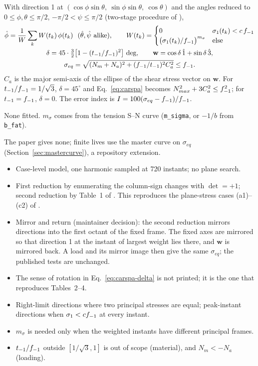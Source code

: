  With direction 1 at $(\cos\phi\sin\theta,\ \sin\phi\sin\theta,\ \cos\theta)$
and the angles reduced to $0\le\phi,\theta\le\pi/2$, $-\pi/2<\psi\le\pi/2$ (two-stage procedure
of \cite{carpinteri1999}),
\begin{gather}
\hat\phi=\frac1W\sum_k W(t_k)\,\phi(t_k)\ \ (\hat\theta,\hat\psi\ \text{alike}),\qquad
W(t_k)=\begin{cases}0 & \sigma_1(t_k)<c\,\fm\\ \bigl(\sigma_1(t_k)/\fm\bigr)^{m_\sigma} & \text{else}\end{cases}
\label{eq:carspa-avg}\\
\delta = 45\cdot\tfrac32\bigl[1-(\tm/\fm)^2\bigr]\ \text{deg},\qquad
\mathbf w=\cos\delta\,\hat 1+\sin\delta\,\hat 3 , \label{eq:carspa-delta}\\
\sigma_{eq}=\sqrt{(N_m+N_a)^2+(\fm/\tm)^2C_a^2}\le\fm . \label{eq:carspa}
\end{gather}
$C_a$ is the major semi-axis of the ellipse of the shear stress vector on $\mathbf w$. For
$t_{-1}/f_{-1}=1/\sqrt3$, $\delta=45^\circ$ and Eq.~\eqref{eq:carspa} becomes $N_{max}^2+3C_a^2\le f_{-1}^2$;
for $t_{-1}=f_{-1}$, $\delta=0$. The error index is $I=100(\sigma_{eq}-f_{-1})/f_{-1}$.

 None fitted. $m_\sigma$ comes from the tension S--N curve
(\texttt{m\_sigma}, or $-1/b$ from \texttt{b\_fat}).

 The paper gives none; finite lives use the master curve on $\sigma_{eq}$
(Section~\ref{sec:mastercurve}), a repository extension.

\begin{itemize}
\item Case-level model, one harmonic sampled at 720 instants; no plane search.
\item First reduction by enumerating the column-sign changes with $\det=+1$; second reduction by
  Table~1 of \cite{carpinteri1999}. This reproduces the plane-stress cases (a1)--(c2) of
  \cite{carpinteri2000}.
\item Mirror and return (maintainer decision): the second reduction mirrors directions into the
  first octant of the fixed frame. The fixed axes are mirrored so that direction 1 at the instant
  of largest weight lies there, and $\mathbf w$ is mirrored back. A load and its mirror image then
  give the same $\sigma_{eq}$; the published tests are unchanged.
\item The sense of rotation in Eq.~\eqref{eq:carspa-delta} is not printed; it is the one that
  reproduces Tables~2--4.
\item Right-limit directions where two principal stresses are equal; peak-instant directions
  when $\sigma_1<cf_{-1}$ at every instant.
\item $m_\sigma$ is needed only when the weighted instants have different principal frames.
\item $t_{-1}/f_{-1}$ outside $[1/\sqrt3,1]$ is out of scope (material), and $N_m<-N_a$ (loading).
\end{itemize}

